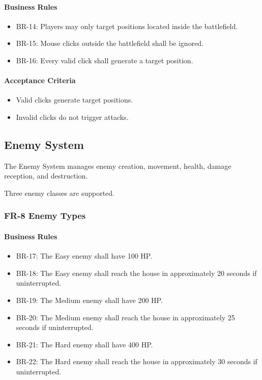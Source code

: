 \documentclass[11pt,a4paper]{article}
\begin{document}
\paragraph{Business Rules}
\begin{itemize}
  \item BR-14: Players may only target positions located inside the battlefield.
  \item BR-15: Mouse clicks outside the battlefield shall be ignored.
  \item BR-16: Every valid click shall generate a target position.
\end{itemize}

\paragraph{Acceptance Criteria}
\begin{itemize}
  \item Valid clicks generate target positions.
  \item Invalid clicks do not trigger attacks.
\end{itemize}

\subsection{Enemy System}

The Enemy System manages enemy creation, movement, health, damage reception, and
destruction.

Three enemy classes are supported.

\subsubsection{FR-8 Enemy Types}

\paragraph{Business Rules}
\begin{itemize}
  \item BR-17: The Easy enemy shall have 100 HP.
  \item BR-18: The Easy enemy shall reach the house in approximately 20 seconds
        if uninterrupted.
  \item BR-19: The Medium enemy shall have 200 HP.
  \item BR-20: The Medium enemy shall reach the house in approximately 25 seconds
        if uninterrupted.
  \item BR-21: The Hard enemy shall have 400 HP.
  \item BR-22: The Hard enemy shall reach the house in approximately 30 seconds
        if uninterrupted.
\end{itemize}
\end{document}
